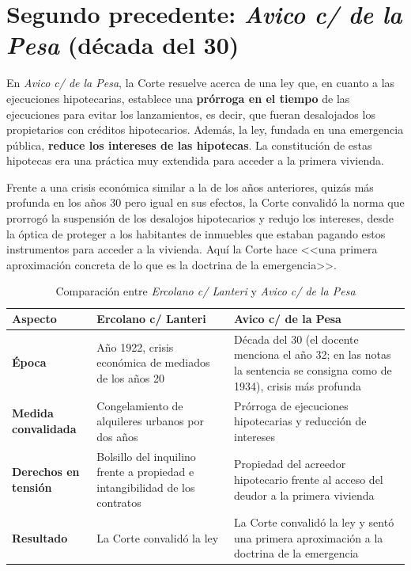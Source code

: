 \documentclass[12pt,oneside]{book}
\begin{document}
\section[Avico c/ de la Pesa]{Segundo precedente: \textit{Avico c/ de la Pesa} (década del 30)}


En \textit{Avico c/ de la Pesa}, la Corte resuelve acerca de una ley que, en cuanto a las ejecuciones hipotecarias, establece una \textbf{prórroga en el tiempo} de las ejecuciones para evitar los lanzamientos, es decir, que fueran desalojados los propietarios con créditos hipotecarios. Además, la ley, fundada en una emergencia pública, \textbf{reduce los intereses de las hipotecas}. La constitución de estas hipotecas era una práctica muy extendida para acceder a la primera vivienda.

Frente a una crisis económica similar a la de los años anteriores, quizás más profunda en los años 30 pero igual en sus efectos, la Corte convalidó la norma que prorrogó la suspensión de los desalojos hipotecarios y redujo los intereses, desde la óptica de proteger a los habitantes de inmuebles que estaban pagando estos instrumentos para acceder a la vivienda. Aquí la Corte hace <<una primera aproximación concreta de lo que es la doctrina de la emergencia>>.

\begin{table}[H]
\centering
\caption{Comparación entre \textit{Ercolano c/ Lanteri} y \textit{Avico c/ de la Pesa}}
\small
\begin{tabularx}{\textwidth}{>{\raggedright\arraybackslash}p{}>{\raggedright\arraybackslash}X>{\raggedright\arraybackslash}X}
\toprule
\textbf{Aspecto} & \textbf{Ercolano c/ Lanteri} & \textbf{Avico c/ de la Pesa} \\
\midrule
\textbf{Época} & Año 1922, crisis económica de mediados de los años 20 & Década del 30 (el docente menciona el año 32; en las notas la sentencia se consigna como de 1934), crisis más profunda \\
\addlinespace
\textbf{Medida convalidada} & Congelamiento de alquileres urbanos por dos años & Prórroga de ejecuciones hipotecarias y reducción de intereses \\
\addlinespace
\textbf{Derechos en tensión} & Bolsillo del inquilino frente a propiedad e intangibilidad de los contratos & Propiedad del acreedor hipotecario frente al acceso del deudor a la primera vivienda \\
\addlinespace
\textbf{Resultado} & La Corte convalidó la ley & La Corte convalidó la ley y sentó una primera aproximación a la doctrina de la emergencia \\
\bottomrule
\end{tabularx}
\end{table}
\end{document}
